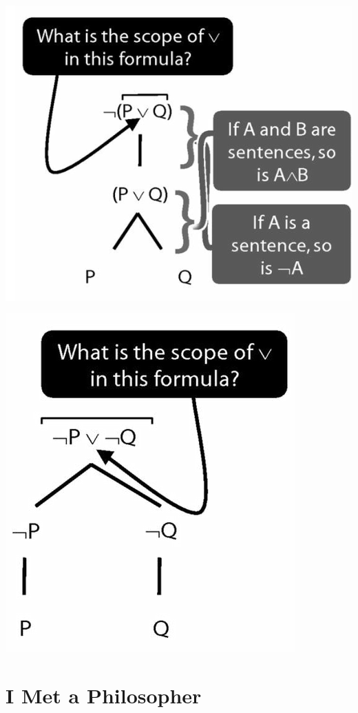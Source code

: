 \documentclass[12pt]{extarticle}
\begin{document}
\begin{multicols*}{3}
\begin{center}
\includegraphics[scale=0.3]{img/unit_320_fig1.png}
\end{center}
\begin{center}
\includegraphics[scale=0.3]{img/unit_320_fig2.png}
\end{center}
 
 
\section{I Met a Philosopher}
 

\end{multicols*}
\end{document}
